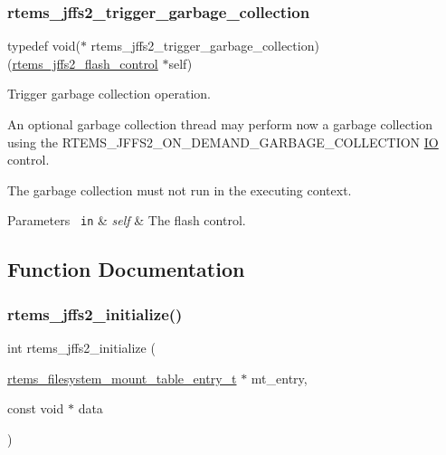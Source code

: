 \subsubsection{\texorpdfstring{rtems\_jffs2\_trigger\_garbage\_collection}{rtems\_jffs2\_trigger\_garbage\_collection}}
{\footnotesize\ttfamily typedef void($\ast$ rtems\+\_\+jffs2\+\_\+trigger\+\_\+garbage\+\_\+collection) (\mbox{\hyperlink{structrtems__jffs2__flash__control}{rtems\+\_\+jffs2\+\_\+flash\+\_\+control}} $\ast$self)}



Trigger garbage collection operation. 

An optional garbage collection thread may perform now a garbage collection using the R\+T\+E\+M\+S\+\_\+\+J\+F\+F\+S2\+\_\+\+O\+N\+\_\+\+D\+E\+M\+A\+N\+D\+\_\+\+G\+A\+R\+B\+A\+G\+E\+\_\+\+C\+O\+L\+L\+E\+C\+T\+I\+ON \mbox{\hyperlink{structIO}{IO}} control.

The garbage collection must not run in the executing context.


\begin{DoxyParams}[1]{Parameters}
\mbox{\texttt{ in}}  & {\em self} & The flash control. \\
\hline
\end{DoxyParams}


\subsection{Function Documentation}
\mbox{\label{group__JFFS2_gac493238b3bfd792173aacb9a7f57949e}} 
\subsubsection{\texorpdfstring{rtems\_jffs2\_initialize()}{rtems\_jffs2\_initialize()}}
{\footnotesize\ttfamily int rtems\+\_\+jffs2\+\_\+initialize (\begin{DoxyParamCaption}\item[{\mbox{\hyperlink{structrtems__filesystem__mount__table__entry__tt}{rtems\+\_\+filesystem\+\_\+mount\+\_\+table\+\_\+entry\+\_\+t}} $\ast$}]{mt\+\_\+entry,  }\item[{const void $\ast$}]{data }\end{DoxyParamCaption})}



